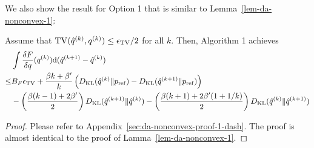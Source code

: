 We also show the result for Option 1 that is similar to Lemma~\ref{lem-da-nonconvex-1}:

\begin{lem}%
    \label{lem-da-nonconvex-1-dash}
    Assume that $\mathrm{TV}(\hat{q}^{(k)}, q^{(k)}) \leq \epsilon_{\mathrm{TV}}/2$ for all $k$. Then, Algorithm 1 achieves 
    \begin{align}
        &\int \frac{\delta F}{\delta q}(q^{(k)})\mathrm{d}(\hat{q}^{(k+1)} - \hat{q}^{(k)})\\
        \leq & B_F\epsilon_{\mathrm{TV}} + \frac{\beta k + \beta'}{k}\left(D_{\mathrm{KL}}(\hat{q}^{(k)}\|p_{\rm{ref}})-D_{\mathrm{KL}}(\hat{q}^{(k+1)}\|p_{\rm{ref}}) \right) \\
        & 
        -  \left( \frac{\beta (k-1) + 2 \beta' }{2}\right) D_{\mathrm{KL}}(\hat{q}^{(k+1)} \| \hat{q}^{(k)}) 
        -  \left( \frac{\beta (k+1) + 2 \beta'(1+1/k) }{2}\right) D_{\mathrm{KL}}(\hat{q}^{(k)} \| \hat{q}^{(k+1)}) 
    \end{align}
\end{lem}

\begin{proof}
    Please refer to Appendix~\ref{sec:da-nonconvex-proof-1-dash}. The proof is almost identical to the proof of Lamma~\ref{lem-da-nonconvex-1}.
\end{proof}

